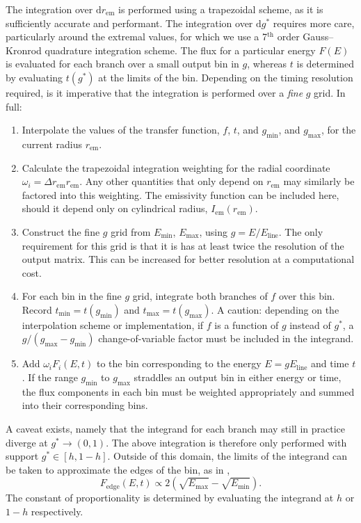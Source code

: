 \documentclass[fleqn,usenatbib]{mnras}
\renewcommand{\d}{\text{d}}
\newcommand{\rhoem}{r_\text{em}}
\begin{document}
The integration over $\d \rhoem$ is performed using a trapezoidal scheme, as it
is sufficiently accurate and performant. The integration over $\d g^\ast$
requires more care, particularly around the extremal values, for which we use a
7$^\text{th}$ order Gauss--Kronrod quadrature integration scheme. The flux for a
particular energy $F(E)$ is evaluated for each branch over a small output bin in
$g$, whereas $t$ is determined by evaluating $t(g^\ast)$ at the limits of the
bin. Depending on the timing resolution required, is it imperative that the
integration is performed over a \emph{fine} $g$ grid. In full:
\begin{enumerate}
    \item Interpolate the values of the transfer function, $f$, $t$, and
        $g_\text{min}$, and $g_\text{max}$, for the current radius $\rhoem$.
    \item Calculate the trapezoidal integration weighting for the radial
        coordinate $\omega_i = \Delta \rhoem \rhoem$. Any other quantities that only
        depend on $\rhoem$ may similarly be factored into this weighting. The
        emissivity function can be included here, should it depend only on
        cylindrical radius, $I_\text{em}(\rhoem)$.
    \item Construct the fine $g$ grid from $E_\text{min}$, $E_\text{max}$, using
        $g = E / E_\text{line}$. The only requirement for this grid is that it
        is has at least twice the resolution of the output matrix. This can be
        increased for better resolution at a computational cost.
    \item For each bin in the fine $g$ grid, integrate both branches of $f$ over
        this bin. Record $t_\text{min} = t(g_\text{min})$ and $t_\text{max} =
        t(g_\text{max})$.  A caution: depending on the interpolation scheme or
        implementation, if $f$ is a function of $g$ instead of $g^\ast$, a $g /
        (g_\text{max} - g_\text{min})$ change-of-variable factor must be
        included in the integrand.
    \item Add $\omega_i F_i(E, t)$ to the bin corresponding to the energy $E =
        gE_\text{line}$ and time $t$. If the range $g_\text{min}$ to
        $g_\text{max}$ straddles an output bin in either energy or time, the
        flux components in each bin must be weighted appropriately and summed
        into their corresponding bins.
\end{enumerate}

A caveat exists, namely that the integrand for each branch may still in practice
diverge at $g^\ast \rightarrow (0, 1)$. The above integration is therefore only
performed with support $g^\ast \in [h, 1 - h]$. Outside of this domain, the
limits of the integrand can be taken to approximate the edges of the bin, as in
\cite{dauser_broad_2010},
\begin{equation}
    F_\text{edge}(E,t) \propto 2\left( \sqrt{E_\text{max}} - \sqrt{E_\text{min}} \right).
\end{equation}
The constant of proportionality is determined by evaluating the integrand at $h$
or $1 - h$ respectively.
\end{document}
